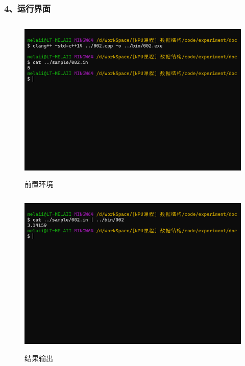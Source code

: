 \documentclass[UTF8, a4paper]{ctexart}
\begin{document}
\subsubsection*{4、运行界面}
\begin{figure}[H]
	\begin{minipage}[t]{\linewidth}
		\centering
		\includegraphics[width=125mm,height=80mm]{./assets/DS02-2}
		\caption{前置环境}
	\end{minipage}
\end{figure}
\begin{figure}[H]
	\begin{minipage}[t]{\linewidth}
		\centering
		\includegraphics[width=125mm,height=80mm]{./assets/DS02-3}
		\caption{结果输出}
	\end{minipage}
\end{figure}
\end{document}
